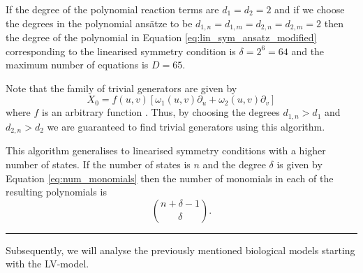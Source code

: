 \begin{remark}
If the degree of the polynomial reaction terms are $d_1=d_2=2$ and if we choose the degrees in the polynomial ans\"atze to be $d_{1,n}=d_{1,m}=d_{2,n}=d_{2,m}=2$ then the degree of the polynomial in Equation \eqref{eq:lin_sym_ansatz_modified} corresponding to the linearised symmetry condition is $\delta=2^6=64$ and the maximum number of equations is $D=65$. 
\end{remark}
\begin{remark}
  Note that the family of trivial generators are given by
  $$X_0=f(u,v)\left[\omega_1(u,v)\partial_u+\omega_2(u,v)\partial_v\right]$$
  where $f$ is an arbitrary function \cite{bluman1989symmetries}. Thus, by choosing the degrees $d_{1,n}>d_1$ and $d_{2,n}>d_2$ we are guaranteed to find trivial generators using this algorithm.
\end{remark}
\begin{remark}
  This algorithm generalises to linearised symmetry conditions with a higher number of states. If the number of states is $n$ and the degree $\delta$ is given by Equation \eqref{eq:num_monomials} then the number of monomials in each of the resulting polynomials is
  $${n+\delta-1\choose \delta}.$$
\end{remark}
\hrule
$\;$\\[0.5cm]
Subsequently, we will analyse the previously mentioned biological models starting with the LV-model. 


  